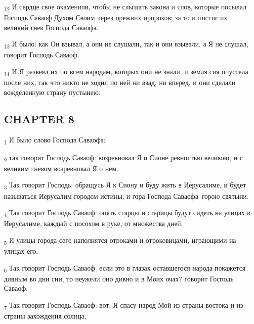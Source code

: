 \begin{tcolorbox}
\textsubscript{12} И сердце свое окаменили, чтобы не слышать закона и слов, которые посылал Господь Саваоф Духом Своим через прежних пророков; за то и постиг их великий гнев Господа Саваофа.
\end{tcolorbox}
\begin{tcolorbox}
\textsubscript{13} И было: как Он взывал, а они не слушали, так и они взывали, а Я не слушал, говорит Господь Саваоф.
\end{tcolorbox}
\begin{tcolorbox}
\textsubscript{14} И Я развеял их по всем народам, которых они не знали, и земля сия опустела после них, так что никто не ходил по ней ни взад, ни вперед, и они сделали вожделенную страну пустынею.
\end{tcolorbox}
\subsection{CHAPTER 8}
\begin{tcolorbox}
\textsubscript{1} И было слово Господа Саваофа:
\end{tcolorbox}
\begin{tcolorbox}
\textsubscript{2} так говорит Господь Саваоф: возревновал Я о Сионе ревностью великою, и с великим гневом возревновал Я о нем.
\end{tcolorbox}
\begin{tcolorbox}
\textsubscript{3} Так говорит Господь: обращусь Я к Сиону и буду жить в Иерусалиме, и будет называться Иерусалим городом истины, и гора Господа Саваофа--горою святыни.
\end{tcolorbox}
\begin{tcolorbox}
\textsubscript{4} Так говорит Господь Саваоф: опять старцы и старицы будут сидеть на улицах в Иерусалиме, каждый с посохом в руке, от множества дней.
\end{tcolorbox}
\begin{tcolorbox}
\textsubscript{5} И улицы города сего наполнятся отроками и отроковицами, играющими на улицах его.
\end{tcolorbox}
\begin{tcolorbox}
\textsubscript{6} Так говорит Господь Саваоф: если это в глазах оставшегося народа покажется дивным во дни сии, то неужели оно дивно и в Моих очах? говорит Господь Саваоф.
\end{tcolorbox}
\begin{tcolorbox}
\textsubscript{7} Так говорит Господь Саваоф: вот, Я спасу народ Мой из страны востока и из страны захождения солнца;
\end{tcolorbox}
